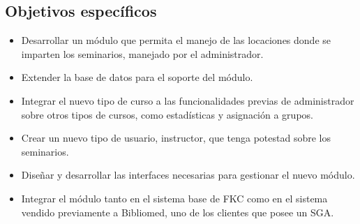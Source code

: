 \subsection*{Objetivos específicos}

\begin{itemize}
	\item Desarrollar un módulo que permita el manejo de las locaciones donde se imparten los seminarios, manejado por el administrador.
	\item Extender la base de datos para el soporte del módulo.
	\item Integrar el nuevo tipo de curso a las funcionalidades previas de administrador sobre otros tipos de cursos, como estadísticas y asignación a grupos.
	\item Crear un nuevo tipo de usuario, instructor, que tenga potestad sobre los seminarios.
	\item Diseñar y desarrollar las interfaces necesarias para gestionar el nuevo módulo.
	\item Integrar el módulo tanto en el sistema base de \gls{FKC} como en el sistema vendido previamente a Bibliomed, uno de los clientes que posee un \gls{SGA}.
\end{itemize}







